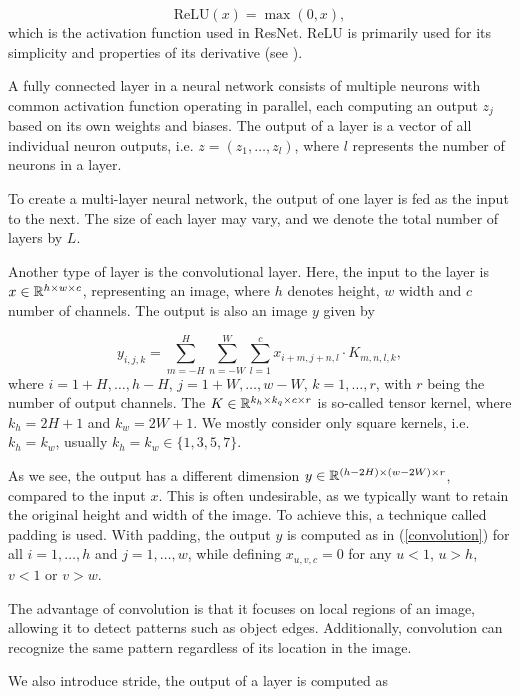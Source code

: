 \begin{equation*}
	\text{ReLU}(x) = \max(0,x),
\end{equation*}
which is the activation function used in ResNet. ReLU is primarily used for its simplicity and properties of its derivative (see \cite{Agarap2018}).  

A fully connected layer in a neural network consists of multiple neurons with common activation function operating in parallel, each computing an output $z_j$ based on its own weights and biases. The output of a layer is a vector of all individual neuron outputs, i.e. $z = (z_1,\dots,z_l)$, where $l$ represents the number of neurons in a layer.

To create a multi-layer neural network, the output of one layer is fed as the input to the next. The size of each layer may vary, and we denote the total number of layers by $L$.

Another type of layer is the convolutional layer. Here, the input to the layer is $x \in \mathbb{R}^{h \times w \times c}$, representing an image, where $h$ denotes height, $w$ width and $c$ number of channels. The output is also an image $y$ given by

\begin{equation}
	y_{i,j,k} = \sum_{m = -H}^{H} \sum_{n = -W}^{W} \sum_{l=1}^{c} x_{i+m,j+n,l} \cdot K_{m,n,l,k},
	\label{convolution}
\end{equation}
where $i = 1+H, \dots, h-H$, $j = 1+W, \dots, w-W$, $k=1,\dots,r$, with $r$ being the number of output channels. The $K \in \mathbb{R}^{k_h \times k_q \times c \times r}$ is so-called tensor kernel, where $k_h = 2H+1$ and $k_w=2W+1$. We mostly consider only square kernels, i.e. $k_h=k_w$, usually $k_h=k_w \in \{1,3,5,7\}$.

As we see, the output has a different dimension $y \in \mathbb{R}^{(h-2H) \times (w-2W) \times r}$, compared to the input $x$. This is often undesirable, as we typically want to retain the original height and width of the image. To achieve this, a technique called padding is used. With padding, the output $y$ is computed as in (\ref{convolution}) for all $i=1,\dots,h$ and $j = 1, \dots, w$, while defining $x_{u,v,c} = 0$ for any $u<1$, $u>h$, $v<1$ or $v>w$.

The advantage of convolution is that it focuses on local regions of an image, allowing it to detect patterns such as object edges. Additionally, convolution can recognize the same pattern regardless of its location in the image.

We also introduce stride, the output of a layer is computed as

